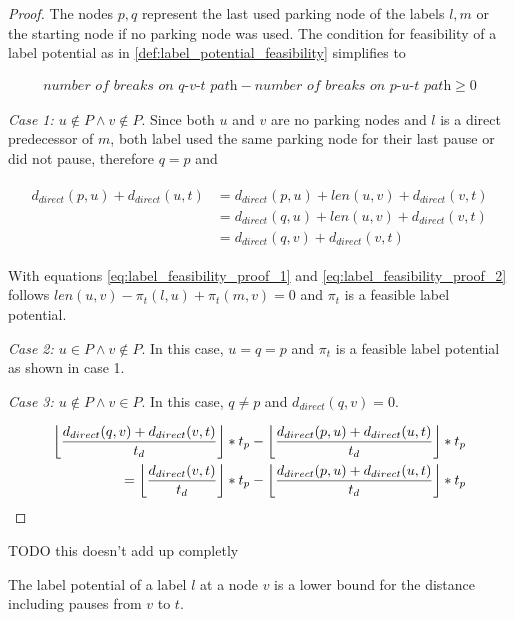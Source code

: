 \begin{proof}
	The nodes $p,q$ represent the last used parking node of the labels $l,m$ or the starting node if no parking node was used. The condition for feasibility of a label potential as in \ref{def:label_potential_feasibility} simplifies to

	\begin{align*}
		\textit{number of breaks on q-v-t path} - \textit{number of breaks on p-u-t path} \ge 0
	\end{align*}

	\emph{Case 1: $u \notin P \land v \notin P$}. Since both $u$ and $v$ are no parking nodes and $l$ is a direct predecessor of $m$, both label used the same parking node for their last pause or did not pause, therefore $q=p$ and

	\begin{align}
		\begin{split}\label{eq:label_feasibility_proof_2}
			d_{direct}(p,u) + d_{direct}(u,t) & = d_{direct}(p,u) + len(u,v) + d_{direct}(v,t) \\
			& = d_{direct}(q,u) + len(u,v) + d_{direct}(v,t) \\
			& = d_{direct}(q,v) + d_{direct}(v,t)
		\end{split}
	\end{align}

	With equations \ref{eq:label_feasibility_proof_1} and \ref{eq:label_feasibility_proof_2} follows $len(u,v) - \pi_t(l,u) + \pi_t(m,v) = 0$ and $\pi_t$ is a feasible label potential.

	\emph{Case 2: $u \in P \land v \notin P$}. In this case, $u = q = p$ and $\pi_t$ is a feasible label potential as shown in case 1.

	\emph{Case 3: $u \notin P \land v \in P$}. In this case, $q \neq p$ and $d_{direct}(q,v) = 0$.

	\begin{align}
		\begin{split}
			\floor*{ \frac{d_{direct}(q,v) + d_{direct}(v,t)}{t_d} } * t_p - \floor*{ \frac{d_{direct}(p,u) + d_{direct}(u,t)}{t_d} } * t_p \\
			= \floor*{ \frac{d_{direct}(v,t)}{t_d} } * t_p - \floor*{ \frac{d_{direct}(p,u) + d_{direct}(u,t)}{t_d} } * t_p
		\end{split}
	\end{align}
\end{proof}
TODO this doesn't add up completly

\begin{lemma}
	The label potential of a label $l$ at a node $v$ is a lower bound for the distance including pauses from $v$ to $t$.
\end{lemma}

